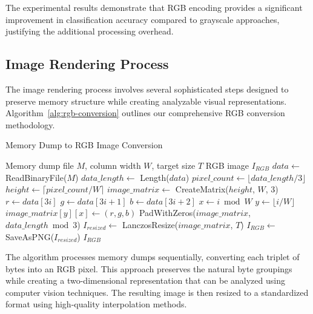 The experimental results demonstrate that RGB encoding provides a significant improvement in classification accuracy compared to grayscale approaches, justifying the additional processing overhead.

\subsection{Image Rendering Process}
\label{subsec:rendering-process}

The image rendering process involves several sophisticated steps designed to preserve memory structure while creating analyzable visual representations. Algorithm~\ref{alg:rgb-conversion} outlines our comprehensive RGB conversion methodology.

\begin{algorithm}[!htbp]
\caption{Memory Dump to RGB Image Conversion}
\label{alg:rgb-conversion}
\begin{algorithmic}[1]
\Require Memory dump file $M$, column width $W$, target size $T$
\Ensure RGB image $I_{RGB}$
\State $data \leftarrow$ ReadBinaryFile($M$)
\State $data\_length \leftarrow$ Length($data$)
\State $pixel\_count \leftarrow \lfloor data\_length / 3 \rfloor$ 
\State $height \leftarrow \lceil pixel\_count / W \rceil$
\State $image\_matrix \leftarrow$ CreateMatrix($height$, $W$, 3)
    \State $r \leftarrow data[3i]$ 
    \State $g \leftarrow data[3i + 1]$ 
    \State $b \leftarrow data[3i + 2]$ 
    \State $x \leftarrow i \bmod W$ 
    \State $y \leftarrow \lfloor i / W \rfloor$ 
    \State $image\_matrix[y][x] \leftarrow (r, g, b)$ 
\EndFor
{} 
    \State PadWithZeros($image\_matrix$, $data\_length \bmod 3$)
\EndIf
\State $I_{resized} \leftarrow$ LanczosResize($image\_matrix$, $T$) 
\State $I_{RGB} \leftarrow$ SaveAsPNG($I_{resized}$) 
\Return $I_{RGB}$
\end{algorithmic}
\end{algorithm}

The algorithm processes memory dumps sequentially, converting each triplet of bytes into an RGB pixel. This approach preserves the natural byte groupings while creating a two-dimensional representation that can be analyzed using computer vision techniques. The resulting image is then resized to a standardized format using high-quality interpolation methods.

